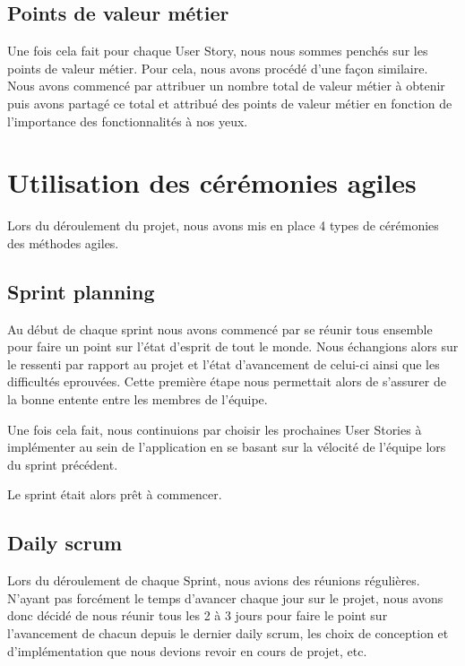 \documentclass[11pt]{report}
\begin{document}
\subsection{Points de valeur métier}

Une fois cela fait pour chaque User Story, nous nous sommes penchés sur les points de valeur métier. Pour cela, nous avons procédé d'une façon similaire. Nous avons commencé par attribuer un nombre total de valeur métier à obtenir puis avons partagé ce total et attribué des points de valeur métier en fonction de l'importance des fonctionnalités à nos yeux.

\section{Utilisation des cérémonies agiles}

Lors du déroulement du projet, nous avons mis en place 4 types de cérémonies des méthodes agiles.

\subsection{Sprint planning}

Au début de chaque sprint nous avons commencé par se réunir tous ensemble pour faire un point sur l'état d'esprit de tout le monde.
Nous échangions alors sur le ressenti par rapport au projet et l'état d'avancement de celui-ci ainsi que les difficultés eprouvées. Cette première étape
nous permettait alors de s'assurer de la bonne entente entre les membres de l'équipe.

Une fois cela fait, nous continuions par choisir les prochaines User Stories à implémenter au sein de l'application en se basant sur la vélocité
de l'équipe lors du sprint précédent.\newline

Le sprint était alors prêt à commencer.

\subsection{Daily scrum}

Lors du déroulement de chaque Sprint, nous avions des réunions régulières. N'ayant pas forcément le temps
d'avancer chaque jour sur le projet, nous avons donc décidé de nous réunir tous les 2 à 3 jours
pour faire le point sur l'avancement de chacun depuis le dernier daily scrum, les choix de conception et d'implémentation que
nous devions revoir en cours de projet, etc.
\end{document}
